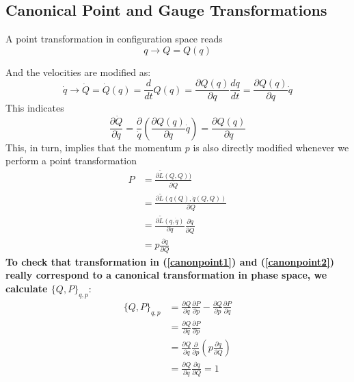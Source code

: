 \subsection{Canonical Point and Gauge Transformations}
A point transformation in configuration space reads
\begin{equation}
    q \rightarrow Q=Q(q)
    \label{canonpoint1}
\end{equation}

And the velocities are modified as:
$$
\dot{q} \rightarrow \dot{Q}=\dot{Q}(q)=\frac{d}{d t} Q(q)=\frac{\partial Q(q)}{\partial q} \frac{d q}{d t}=\frac{\partial Q(q)}{\partial q} \dot{q}
$$
This indicates
$$
\frac{\partial \dot{Q}}{\partial \dot{q}} = \frac{\partial}{\dot{q}}\left(\frac{\partial Q(q)}{\partial q} \dot{q}\right)=\frac{\partial Q(q)}{\partial q}
$$
This, in turn, implies that the momentum $p$ is also directly modified whenever we perform a point transformation
\begin{equation}
    \begin{aligned}
P &=\frac{\partial \tilde{L}(Q, Q))}{\partial \dot{Q}} \\
&=\frac{\partial \tilde{L}(q(Q), \dot{q}(Q, Q))}{\partial Q} \\
&=\frac{\partial \tilde{L}(q, \dot{q})}{\partial \dot{q}} \frac{\partial \dot{q}}{\partial \dot{Q}} \\
&=p \frac{\partial q}{\partial Q}
\end{aligned}
\label{canonpoint2}
\end{equation}
\textbf{To check that transformation in (\ref{canonpoint1}) and (\ref{canonpoint2}) really correspond to a canonical transformation in phase space, we calculate $\{Q, P\}_{q, p}$}:
$$
\begin{aligned}
\{Q, P\}_{q, p} &=\frac{\partial Q}{\partial q} \frac{\partial P}{\partial p}-\frac{\partial Q}{\partial p} \frac{\partial P}{\partial q} \\
&=\frac{\partial Q}{\partial q} \frac{\partial P}{\partial p} \\
&=\frac{\partial Q}{\partial q} \frac{\partial}{\partial p}\left(p \frac{\partial q}{\partial Q}\right) \\
&=\frac{\partial Q}{\partial q} \frac{\partial q}{\partial Q}=1
\end{aligned}
$$

